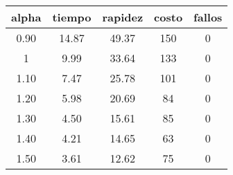 \begin{table}[h!]
\centering
\begin{tabular}{ccccc}
alpha & tiempo & rapidez & costo & fallos \\ 
\hline 
0.90 & 14.87 & 49.37 & 150 & 0 \\ 
1 & 9.99 & 33.64 & 133 & 0 \\ 
1.10 & 7.47 & 25.78 & 101 & 0 \\ 
1.20 & 5.98 & 20.69 & 84 & 0 \\ 
1.30 & 4.50 & 15.61 & 85 & 0 \\ 
1.40 & 4.21 & 14.65 & 63 & 0 \\ 
1.50 & 3.61 & 12.62 & 75 & 0 \\ 
\hline 
\end{tabular}
\end{table}